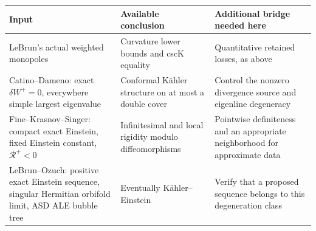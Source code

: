 \documentclass[
  11pt,
]{article}
\begin{document}
\begin{longtable}[]{@{}lll@{}}
\toprule
\begin{minipage}[b]{0.30\columnwidth}\raggedright
Input\strut
\end{minipage} & \begin{minipage}[b]{0.30\columnwidth}\raggedright
Available conclusion\strut
\end{minipage} & \begin{minipage}[b]{0.30\columnwidth}\raggedright
Additional bridge needed here\strut
\end{minipage}\tabularnewline
\midrule
\endhead
\begin{minipage}[t]{0.30\columnwidth}\raggedright
LeBrun's actual weighted monopoles\strut
\end{minipage} & \begin{minipage}[t]{0.30\columnwidth}\raggedright
Curvature lower bounds and cscK equality\strut
\end{minipage} & \begin{minipage}[t]{0.30\columnwidth}\raggedright
Quantitative retained losses, as above\strut
\end{minipage}\tabularnewline
\begin{minipage}[t]{0.30\columnwidth}\raggedright
Catino--Dameno: exact \(\delta W^+=0\), everywhere simple largest
eigenvalue\strut
\end{minipage} & \begin{minipage}[t]{0.30\columnwidth}\raggedright
Conformal Kähler structure on at most a double cover\strut
\end{minipage} & \begin{minipage}[t]{0.30\columnwidth}\raggedright
Control the nonzero divergence source and eigenline degeneracy\strut
\end{minipage}\tabularnewline
\begin{minipage}[t]{0.30\columnwidth}\raggedright
Fine--Krasnov--Singer: compact exact Einstein, fixed Einstein constant,
\(\mathcal R^+<0\)\strut
\end{minipage} & \begin{minipage}[t]{0.30\columnwidth}\raggedright
Infinitesimal and local rigidity modulo diffeomorphisms\strut
\end{minipage} & \begin{minipage}[t]{0.30\columnwidth}\raggedright
Pointwise definiteness and an appropriate neighborhood for approximate
data\strut
\end{minipage}\tabularnewline
\begin{minipage}[t]{0.30\columnwidth}\raggedright
LeBrun--Ozuch: positive exact Einstein sequence, singular Hermitian
orbifold limit, ASD ALE bubble tree\strut
\end{minipage} & \begin{minipage}[t]{0.30\columnwidth}\raggedright
Eventually Kähler--Einstein\strut
\end{minipage} & \begin{minipage}[t]{0.30\columnwidth}\raggedright
Verify that a proposed sequence belongs to this degeneration class\strut
\end{minipage}\tabularnewline
\bottomrule
\end{longtable}
\end{document}

